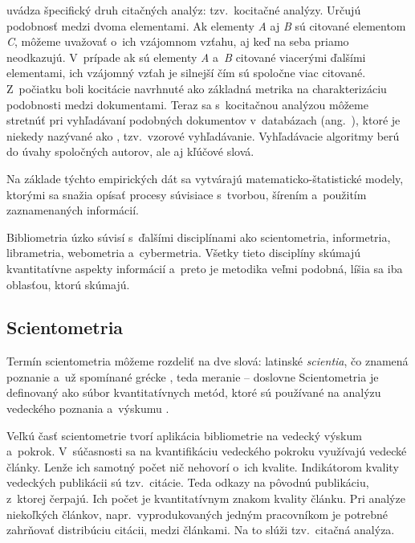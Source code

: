 \citet{Vavrikova2008} uvádza špecifický druh citačných analýz: tzv.~kocitačné
analýzy.  Určujú podobnosť medzi dvoma elementami.  Ak
elementy \emph{A} aj \emph{B} sú citované elementom \emph{C}, môžeme uvažovať
o~ich vzájomnom vzťahu, aj keď na seba priamo neodkazujú.  V~prípade ak sú
elementy \emph{A} a~\emph{B} citované viacerými ďalšími elementami, ich vzájomný
vzťah je silnejší čím sú spoločne viac citované.  Z~počiatku boli kocitácie
navrhnuté ako základná metrika na charakterizáciu podobnosti medzi dokumentami.
Teraz sa s~kocitačnou analýzou môžeme stretnúť pri vyhľadávaní podobných
dokumentov v~databázach (ang.~), ktoré je niekedy
nazývané ako , tzv.~vzorové vyhľadávanie.  Vyhľadávacie
algoritmy berú do úvahy spoločných autorov, ale aj kľúčové slová.

Na základe týchto empirických dát sa vytvárajú matematicko-štatistické modely,
ktorými sa snažia opísať procesy súvisiace s~tvorbou, šírením a~použitím
zaznamenaných informácií.

Bibliometria úzko súvisí s~ďalšími disciplínami ako scientometria, informetria,
librametria, webometria a~cybermetria.  Všetky tieto disciplíny skúmajú
kvantitatívne aspekty informácií a~preto je metodika veľmi podobná, líšia sa iba
oblasťou, ktorú skúmajú.


\subsection{Scientometria}

Termín scientometria môžeme rozdeliť na dve slová: latinské
\emph{scientia}, čo znamená poznanie a~už
spomínané grécke , teda
meranie -- doslovne  Scientometria je definovaný ako
súbor kvantitatívnych metód, ktoré sú používané na analýzu vedeckého poznania
a~výskumu \citep{Hood2001}.

Veľkú časť scientometrie tvorí aplikácia bibliometrie na vedecký výskum
a~pokrok.  V~súčasnosti sa na kvantifikáciu vedeckého pokroku využívajú vedecké
články.  Lenže ich samotný počet nič nehovorí o~ich kvalite.  Indikátorom
kvality vedeckých publikácii sú tzv.~citácie.  Teda odkazy na pôvodnú
publikáciu, z~ktorej čerpajú.  Ich počet je kvantitatívnym znakom kvality
článku.  Pri analýze niekoľkých článkov, napr.~vyprodukovaných jedným
pracovníkom je potrebné zahrňovať distribúciu citácii, medzi článkami.  Na to
slúži tzv.~citačná analýza.

